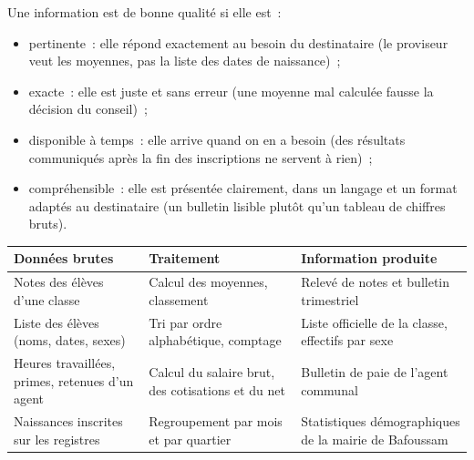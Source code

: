 \documentclass[11pt]{article}
\newcommand{\cle}[1]{{\popxbold\color{popdark}#1}}
\begin{document}
\begin{definition}
Une information est de bonne qualité si elle est~:
\begin{itemize}
\item \cle{pertinente}~: elle répond exactement au besoin du destinataire (le proviseur veut les moyennes, pas la liste des dates de naissance)~;
\item \cle{exacte}~: elle est juste et sans erreur (une moyenne mal calculée fausse la décision du conseil)~;
\item \cle{disponible à temps}~: elle arrive quand on en a besoin (des résultats communiqués après la fin des inscriptions ne servent à rien)~;
\item \cle{compréhensible}~: elle est présentée clairement, dans un langage et un format adaptés au destinataire (un bulletin lisible plutôt qu'un tableau de chiffres bruts).
\end{itemize}
\end{definition}

\begin{exemplebox}
\begin{center}
\begin{tabularx}{\linewidth}{|X|X|X|}
\hline
\rowcolor{popblueL} \textbf{Données brutes} & \textbf{Traitement} & \textbf{Information produite} \\
\hline
Notes des élèves d'une classe & Calcul des moyennes, classement & Relevé de notes et bulletin trimestriel \\
\hline
Liste des élèves (noms, dates, sexes) & Tri par ordre alphabétique, comptage & Liste officielle de la classe, effectifs par sexe \\
\hline
Heures travaillées, primes, retenues d'un agent & Calcul du salaire brut, des cotisations et du net & Bulletin de paie de l'agent communal \\
\hline
Naissances inscrites sur les registres & Regroupement par mois et par quartier & Statistiques démographiques de la mairie de Bafoussam \\
\hline
\end{tabularx}
\end{center}
\end{exemplebox}
\end{document}
